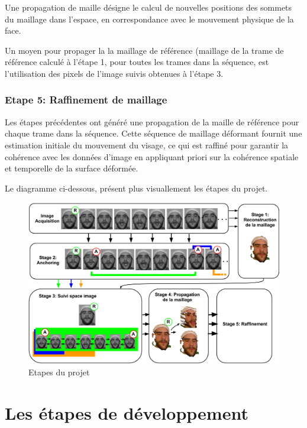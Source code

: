\documentclass[a4paper,12pt]{article}
\begin{document}
Une propagation de maille désigne le calcul de nouvelles positions des
sommets du maillage dans l'espace, en correspondance avec le mouvement
physique de la face.

Un moyen pour propager la la maillage de référence (maillage de la
trame de référence calculé à l'étape 1, pour toutes les trames dans
la séquence, est l'utilisation des pixels de l'image suivis obtenues à
l'étape 3.
 
\subsubsection*{Etape 5: Raffinement de maillage}

Les étapes précédentes ont généré une propagation de la maille de
référence pour chaque trame dans la séquence. Cette séquence de
maillage déformant fournit une estimation initiale du mouvement du
visage, ce qui est raffiné pour garantir la cohérence avec les données
d'image en appliquant priori sur la cohérence spatiale et temporelle
de la surface déformée.

Le diagramme ci-dessous, présent plus visuallement les étapes du projet.

\begin{figure}[ht!]
  \begin{center}
    \includegraphics[scale=0.4]{img/projDiagram.png}
    \caption{Etapes du projet}
  \end{center}
\end{figure}




\newpage
\section{Les étapes de développement}
\end{document}
